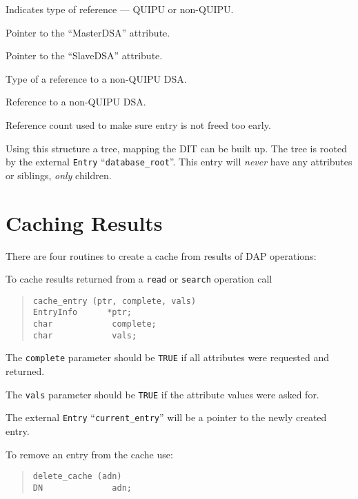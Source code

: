 \begin{describe}
\item [\verb"e\_external":] Indicates type of reference --- QUIPU or
non-QUIPU.
\item [\verb"e\_master":] Pointer to the ``MasterDSA'' attribute.
\item [\verb"e\_slave":] Pointer to the ``SlaveDSA'' attribute.
\item [\verb"e\_reftype":] Type of a reference to a non-QUIPU DSA.
\item [\verb"e\_reference":] Reference to a non-QUIPU DSA.

\item [\verb"e\_refcount":] Reference count used to make sure entry is
not freed too early.

\end{describe}

Using this structure a tree, mapping the DIT can be built up.
The tree is rooted by the external \verb"Entry" ``\verb"database_root"''.
This entry will {\em never} have any attributes or siblings,
{\em only} children.

\section {Caching Results}

There are four routines to create a cache from results of DAP operations:

To cache results returned from a \verb"read" or \verb"search" operation call
\begin{quote}\small\begin{verbatim}
cache_entry (ptr, complete, vals)
EntryInfo      *ptr;
char            complete;
char            vals;
\end{verbatim}\end{quote}

The \verb"complete" parameter should be \verb"TRUE" if all attributes were requested
and returned.

The \verb"vals" parameter should be \verb"TRUE" if the attribute values were
asked for.

The external \verb"Entry" ``\verb"current_entry"'' will be a pointer to 
the newly created entry.

To remove an entry from the cache use:
\begin{quote}\small\begin{verbatim}
delete_cache (adn)
DN              adn;
\end{verbatim}\end{quote}


